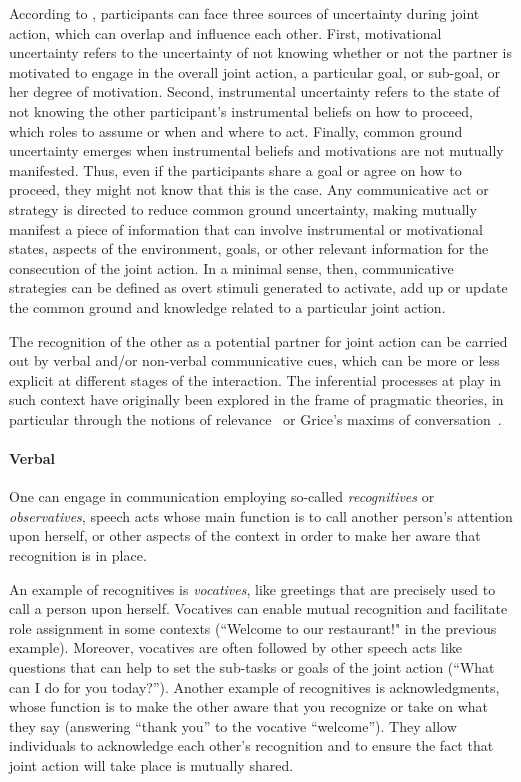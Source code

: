 \documentclass[a4paper,11pt,twoside]{StyleThese}
\begin{document}
According to \cite{michael_2015_commitments}, participants can face three sources of uncertainty during joint action, which can overlap and influence each other. First, motivational uncertainty refers to the uncertainty of not knowing whether or not the partner is motivated to engage in the overall joint action, a particular goal, or sub-goal, or her degree of motivation. Second, instrumental uncertainty refers to the state of not knowing the other participant’s instrumental beliefs on how to proceed, \ie which roles to assume or when and where to act. Finally, common ground uncertainty emerges when instrumental beliefs and motivations are not mutually manifested. Thus, even if the participants share a goal or agree on how to proceed, they might not know that this is the case. Any communicative act or strategy is directed to reduce common ground uncertainty, making mutually manifest a piece of information that can involve instrumental or motivational states, aspects of the environment, goals, or other relevant information for the consecution of the joint action. In a minimal sense, then, communicative strategies can be defined as overt stimuli generated to activate, add up or update the common ground and knowledge related to a particular joint action. 

The recognition of the other as a potential partner for joint action can be carried out by verbal and/or non-verbal communicative cues, which can be more or less explicit at different stages of the interaction. The inferential processes at play in such context have originally been explored in the frame of pragmatic theories, in particular through the notions of relevance~\citep{sperber_1995_relevance} or Grice’s maxims of conversation~\citep{grice_1989_studies}.

\paragraph{Verbal} One can engage in communication employing so-called \emph{recognitives} or \emph{observatives}, speech acts whose main function is to call another person’s attention upon herself, or other aspects of the context in order to make her aware that recognition is in place. 

An example of recognitives is \emph{vocatives}, like greetings that are precisely used to call a person upon herself. Vocatives can enable mutual recognition and facilitate role assignment in some contexts (\eg ``Welcome to our restaurant!" in the previous example). Moreover, vocatives are often followed by other speech acts like questions that can help to set the sub-tasks or goals of the joint action (\eg ``What can I do for you today?''). Another example of recognitives is acknowledgments, whose function is to make the other aware that you recognize or take on what they say (\eg answering ``thank you'' to the vocative ``welcome''). They allow individuals to acknowledge each other's recognition and to ensure the fact that joint action will take place is mutually shared. 
\end{document}
